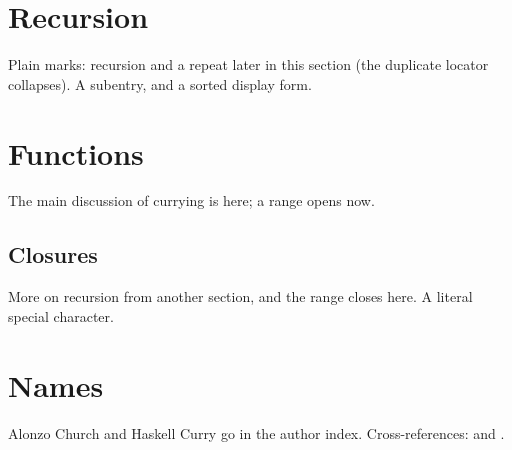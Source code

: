 \section{Recursion \label{sec:rec}}

Plain marks: recursion and a repeat later in this
section (the duplicate locator collapses). A
subentry, and a sorted display
form.

\section{Functions}

The main discussion of currying is here; a
range opens now.

\subsection{Closures}

More on recursion from another section, and the range
closes here. A literal special character.

\section{Names}

Alonzo Church and Haskell
Curry go in the author index.
Cross-references: 
and .

\printindex

\printindex[authors]

